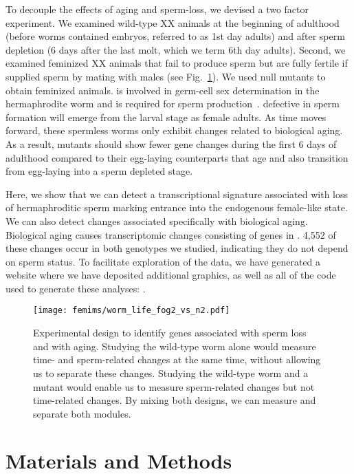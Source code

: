To decouple the effects of aging and sperm-loss, we devised a two factor
experiment. We examined wild-type XX animals at the beginning of adulthood
(before worms contained embryos, referred to as 1st day adults) and after sperm
depletion (6 days after the last molt, which we term 6th day adults). Second, we
examined feminized XX animals that fail to produce sperm but are fully fertile
if supplied sperm by mating with males (see Fig.~\ref{fig:wormlife}). We used
 null mutants to obtain feminized animals.  is involved in
germ-cell sex determination in the hermaphrodite worm and is required for sperm
production~\citep{Schedl1988,Clifford2000}. \cel{} defective in sperm formation
will emerge from the larval stage as female adults. As time moves forward, these
spermless worms only exhibit changes related to biological aging. As a result,
\fog{} mutants should show fewer gene changes during the first 6 days of
adulthood compared to their egg-laying counterparts that age and also transition
from egg-laying into a sperm depleted stage.

Here, we show that we can detect a transcriptional signature associated
with loss of hermaphroditic sperm marking entrance into the endogenous
female-like state. We can also detect changes associated specifically with
biological aging. Biological aging causes transcriptomic changes consisting of
\agen{} genes in \cel{}. 4,552 of these changes occur in both genotypes we
studied, indicating they do not depend on sperm status. To facilitate
exploration of the data, we have generated a website where we have deposited
additional graphics, as well as all of the code used to generate these analyses:
\website{}.

\begin{figure}[htbp]
  \renewcommand{\familydefault}{\sfdefault}\normalfont{}
  \centering
  \texttt{[image: femims/worm\_life\_fog2\_vs\_n2.pdf]}
    \caption{
    Experimental design to identify genes associated with sperm loss and with
    aging. Studying the wild-type worm alone would measure time- and
    sperm-related changes at the same time, without allowing us to separate
    these changes. Studying the wild-type worm and a \fog{} mutant would enable
    us to measure sperm-related changes but not time-related changes. By mixing
    both designs, we can measure and separate both modules.
  }%
\label{fig:wormlife}
\end{figure}


\section{Materials and Methods}
\label{sec:materials_methods}

